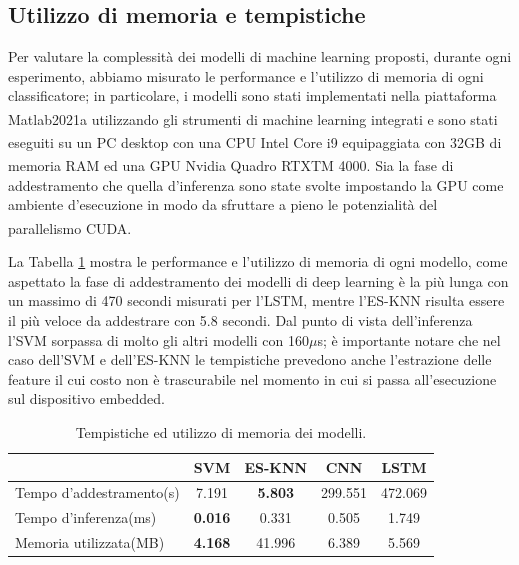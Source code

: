 \subsection{Utilizzo di memoria e tempistiche}
\label{ssec:utilizzo-di-memoria-e-tempistiche}

Per valutare la complessità dei modelli di machine learning proposti, durante ogni esperimento, abbiamo misurato le performance e l'utilizzo di memoria di ogni classificatore; in particolare, i modelli sono stati implementati nella piattaforma Matlab2021a\textsuperscript{\textregistered} utilizzando gli strumenti di machine learning integrati e sono stati eseguiti su un PC desktop con una CPU Intel\textsuperscript{\textregistered} Core i9 equipaggiata con 32GB di memoria RAM ed una GPU Nvidia\textsuperscript{\textregistered} Quadro\textsuperscript{\textregistered} RTXTM 4000. Sia la fase di addestramento che quella d'inferenza sono state svolte impostando la GPU come ambiente d'esecuzione in modo da sfruttare a pieno le potenzialità del parallelismo CUDA\textsuperscript{\textregistered}.

La Tabella \ref{tab:memory} mostra le performance e l'utilizzo di memoria di ogni modello, come aspettato la fase di addestramento dei modelli di deep learning è la più lunga con un massimo di 470 secondi misurati per l'LSTM, mentre l'ES-KNN risulta essere il più veloce da addestrare con 5.8 secondi. Dal punto di vista dell'inferenza l'SVM sorpassa di molto gli altri modelli con 160$\mu$s; è importante notare che nel caso dell'SVM e dell'ES-KNN le tempistiche prevedono anche l'estrazione delle feature il cui costo non è trascurabile nel momento in cui si passa all'esecuzione sul dispositivo embedded.

\begin{table}
    \centering
    \begin{tabular}{l c c c c}
        \hline
        & SVM & ES-KNN & CNN & LSTM \\
        \hline
        Tempo d'addestramento(s) & 7.191 & \textbf{5.803} & 299.551  & 472.069 \\
        Tempo d'inferenza(ms) & \textbf{0.016} & 0.331 & 0.505  & 1.749 \\
        Memoria utilizzata(MB) & \textbf{4.168} & 41.996& 6.389 & 5.569 \\
        \hline
    \end{tabular}
    \caption{Tempistiche ed utilizzo di memoria dei modelli.}
    \label{tab:memory}
\end{table}

